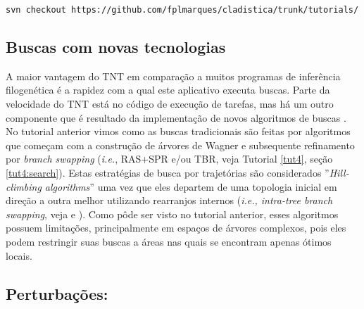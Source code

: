 \begin{center}
\small \texttt{svn checkout https://github.com/fplmarques/cladistica/trunk/tutorials/}\\
\end{center}

\newpage
\pagestyle{fancy} %
\begin{refsection}
\renewcommand*{\finalnamedelim}{\addspace\&\space}%

\section{Buscas com novas tecnologias}\label{tut5:newtech}

A maior vantagem do TNT \parencite{GoloboffEtAl_2008} em comparação a muitos programas de inferência filogenética é a rapidez com a qual este aplicativo executa buscas. Parte da velocidade do TNT está no código de execução de tarefas, mas há um outro componente que é resultado da implementação de novos algoritmos de buscas \parencite{Goloboff_1999, Nixon_1999}. No tutorial anterior vimos como as buscas tradicionais são feitas por algoritmos que começam com a construção de árvores de Wagner e subsequente refinamento por \textit{branch swapping} (\textit{i.e.}, RAS+SPR e/ou TBR, veja Tutorial \ref{tut4}, seção \ref{tut4:search}). Estas estratégias de busca por trajetórias são considerados ''\textit{Hill-climbing algorithms}'' uma vez que eles departem de uma topologia inicial em direção a outra melhor utilizando rearranjos internos (\textit{i.e., intra-tree branch swapping}, veja \textcite{Giribet_2007} e \textcite{Goloboff_1999}). Como pôde ser visto no tutorial anterior, esses algoritmos possuem limitações, principalmente em espaços de árvores complexos, pois eles podem restringir suas buscas a áreas nas quais se encontram apenas ótimos locais.

\subsection{Perturbações:}


\end{refsection}
